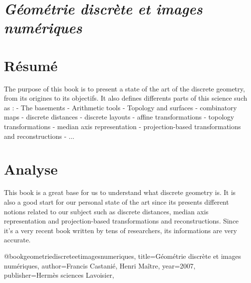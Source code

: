 \documentclass[a4paper,11pt]{report}
\begin{document}
\section{\emph{Géométrie discrète et images numériques}}


\section{Résumé}

The purpose of this book is to present a state of the art of the discrete geometry, from its origines to its objectifs. It also defines differents parts of this science such as :
 - The basements
 - Arithmetic tools
 - Topology and surfaces
 - combinatory maps
 - discrete distances
 - discrete layouts
 - affine transformations
 - topology transformations
 - median axis representation
 - projection-based transformations and reconstructions
 - ...

\section{Analyse}

This book is a great base for us to understand what discrete geometry is. It is also a good start for our personal state of the art since its presents different notions related to our subject such as discrete distances, median axis representation and projection-based transformations and reconstructions. Since it's a very recent book written by tens of researchers, its informations are very accurate.


@book{geometriediscreteetimagesnumeriques,
title={Géométrie discrète et images numériques},
author={Francis Castanié, Henri Maître},
  year={2007},
  publisher={Hermès sciences Lavoisier},
}
\end{document}
